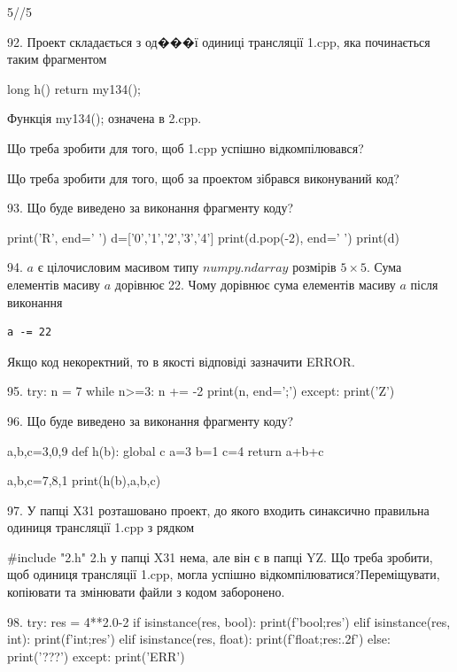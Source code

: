 \documentclass[11pt]{article}
\begin{document}
{%
5//5%

92. 
Проект складається з од���ї одиниці трансляції 1.cpp, яка починається таким фрагментом\par
long h(){ return my134();}\par
Функція my134(); означена в 2.cpp.\par
Що треба зробити для того, щоб 1.cpp успішно відкомпілювався?\par\vspace{1.5cm}
Що треба зробити для того, щоб за проектом зібрався виконуваний код?\par

93. Що буде виведено за виконання фрагменту коду?

print('R', end=' ')
d=['0','1','2','3','4']
print(d.pop(-2), end=' ')
print(d)


94. 
$a$ є цілочисловим масивом типу $numpy.ndarray$ розмірів $5{\times}5$. Сума елементів масиву $a$ дорівнює 22. Чому дорівнює сума елементів масиву $a$ після виконання 
\begin{verbatim}
a -= 22
\end{verbatim}


Якщо код некоректний, то в якості відповіді зазначити ERROR.



95. 
try:
    n = 7
    while n>=3:
        n += -2
    print(n, end=';')
except:
    print('Z')

96. Що буде виведено за виконання фрагменту коду?

a,b,c=3,0,9
def h(b):
global c    a=3
    b=1
    c=4
    return a+b+c

a,b,c=7,8,1
print(h(b),a,b,c)

97. 
У папці X31 розташовано проект, до якого входить синаксично правильна одиниця трансляції 1.cpp з рядком\par
{\#}include "2.h"
 2.h у папці X31 нема, але він є в папці YZ. Що треба зробити, щоб одиниця трансляції 1.cpp, могла успішно відкомпілюватися?Переміщувати, копіювати та змінювати файли з кодом заборонено.\par\vspace{1.5cm}
98. 
try:
    res = 4**2.0-2
    if isinstance(res, bool):
        print(f'bool;{res}')
    elif isinstance(res, int):
        print(f'int;{res}')
    elif isinstance(res, float):
        print(f'float;{res:.2f}')
    else:
        print('???')
except:
    print('ERR')

}
\end{document}

